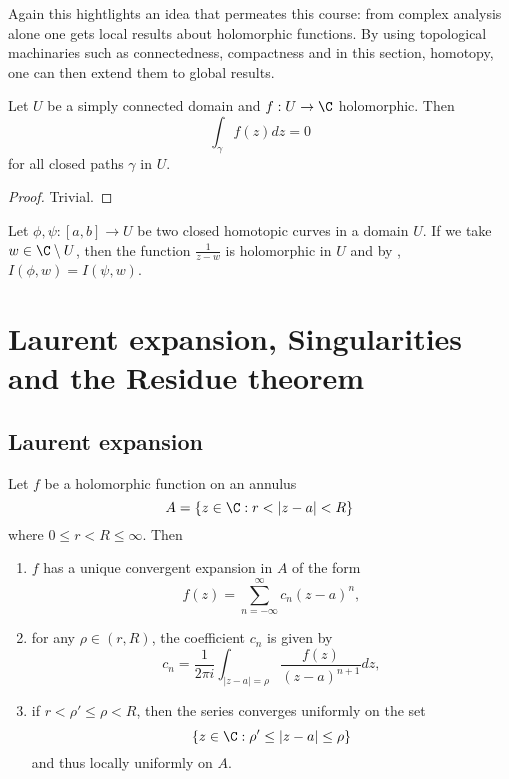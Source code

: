 \documentclass[a4paper]{article}
\begin{document}
Again this hightlights an idea that permeates this course: from complex analysis alone one gets local results about holomorphic functions. By using topological machinaries such as connectedness, compactness and in this section, homotopy, one can then extend them to global results.

\begin{corollary}
  Let \(U\) be a simply connected domain and \(f: U \to \C\) holomorphic. Then
  \[
    \int_\gamma f(z)dz = 0
  \]
  for all closed paths \(\gamma\) in \(U\).
\end{corollary}

\begin{proof}
  Trivial.
\end{proof}

\begin{remark}
  Let \(\phi, \psi: [a, b] \to U\) be two closed homotopic curves in a domain \(U\). If we take \(w \in \C \setminus U\), then the function \(\frac{1}{z - w}\) is holomorphic in \(U\) and by , \(I(\phi, w) = I(\psi, w)\).
\end{remark}

\section{Laurent expansion, Singularities and the Residue theorem}

\subsection{Laurent expansion}

\begin{theorem}
  Let \(f\) be a holomorphic function on an annulus
  \[
    A = \{z \in \C: r < |z - a| < R\}
  \]
  where \(0 \leq r < R \leq \infty\). Then
  \begin{enumerate}
  \item \(f\) has a unique convergent expansion in \(A\) of the form
    \begin{equation}
      \label{eqn:Laurent}
      f(z) = \sum_{n = -\infty}^\infty c_n(z - a)^n,
      \tag{\(\ast\)}
    \end{equation}
  \item for any \(\rho \in (r, R)\), the coefficient \(c_n\) is given by
    \[
      c_n = \frac{1}{2\pi i} \int_{|z - a| = \rho} \frac{f(z)}{(z - a)^{n + 1}} dz,
    \]
  \item if \(r < \rho' \leq \rho < R\), then the series converges uniformly on the set
    \[
      \{z \in \C: \rho' \leq |z - a| \leq \rho\}
    \]
    and thus locally uniformly on \(A\).
  \end{enumerate}
\end{theorem}
\end{document}
